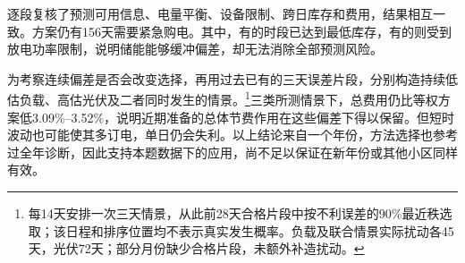 逐段复核了预测可用信息、电量平衡、设备限制、跨日库存和费用，结果相互一致。方案仍有156天需要紧急购电。其中，有的时段已达到最低库存，有的则受到放电功率限制，说明储能能够缓冲偏差，却无法消除全部预测风险。

为考察连续偏差是否会改变选择，再用过去已有的三天误差片段，分别构造持续低估负载、高估光伏及二者同时发生的情景。\footnote{每14天安排一次三天情景，从此前28天合格片段中按不利误差的90\%最近秩选取；该日程和排序位置均不表示真实发生概率。负载及联合情景实际扰动各45天，光伏72天；部分月份缺少合格片段，未额外补造扰动。}三类所测情景下，总费用仍比等权方案低3.09\%--3.52\%，说明近期准备的总体节费作用在这些偏差下得以保留。但短时波动也可能使其多订电，单日仍会失利。以上结论来自一个年份，方法选择也参考过全年诊断，因此支持本题数据下的应用，尚不足以保证在新年份或其他小区同样有效。
